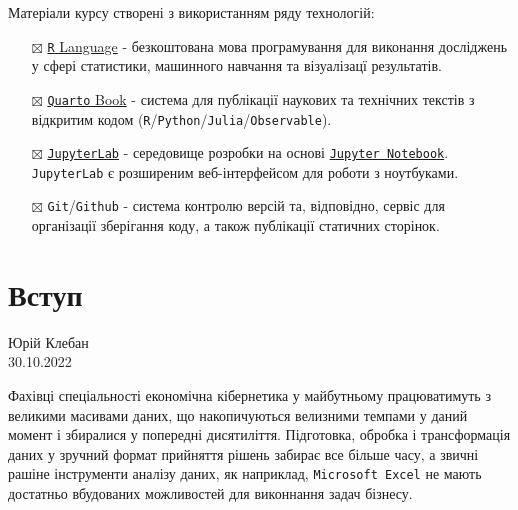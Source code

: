 \documentclass[
  letterpaper,
  DIV=11,
  numbers=noendperiod]{scrreprt}
\begin{document}
\begin{tcolorbox}[enhanced jigsaw, arc=.35mm, colback=white, rightrule=.15mm, breakable, colframe=quarto-callout-note-color-frame, toprule=.15mm, leftrule=.75mm, bottomrule=.15mm, left=2mm, opacityback=0]
\begin{minipage}[t]{5.5mm}
\textcolor{quarto-callout-note-color}{\faInfo}
\end{minipage}%
\begin{minipage}[t]{\textwidth - 5.5mm}

Матеріали курсу створені з використанням ряду технологій:

\begin{itemize}
\item[$\boxtimes$]
  \href{https://www.r-project.org}{\texttt{R} Language} - безкоштована
  мова програмування для виконання досліджень у сфері статистики,
  машинного навчання та візуалізацї результатів.
\item[$\boxtimes$]
  \href{https://quarto.org}{\texttt{Quarto} Book} - система для
  публікації наукових та технічних текстів з відкритим кодом
  (\texttt{R}/\texttt{Python}/\texttt{Julia}/\texttt{Observable}).
\item[$\boxtimes$]
  \href{https://github.com/jupyterlab/jupyterlab}{\texttt{JupyterLab}} -
  середовище розробки на основі
  \href{https://jupyter.org/}{\texttt{Jupyter\ Notebook}}.
  \texttt{JupyterLab} є розширеним веб-інтерфейсом для роботи з
  ноутбуками.
\item[$\boxtimes$]
  \texttt{Git}/\texttt{Github} - система контролю версій та, відповідно,
  сервіс для організації зберігання коду, а також публікації статичних
  сторінок.
\end{itemize}

\end{minipage}%
\end{tcolorbox}


\hypertarget{ux432ux441ux442ux443ux43f}{%
\chapter*{Вступ}\label{ux432ux441ux442ux443ux43f}}

Юрій Клебан\\
30.10.2022

\hfill\break

Фахівці спеціальності економічна кібернетика у майбутньому працюватимуть
з великими масивами даних, що накопичуються велизними темпами у даний
момент і збиралися у попередні дисятиліття. Підготовка, обробка і
трансформація даних у зручний формат прийняття рішень забирає все більше
часу, а звичні рашіне інструменти аналізу даних, як наприклад,
\texttt{Microsoft\ Excel} не мають достатньо вбудованих можливостей для
виконнання задач бізнесу.
\end{document}

